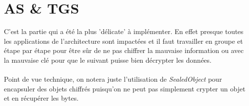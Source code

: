\documentclass[11pt,fleqn]{article}
\begin{document}
\section{AS \& TGS}
C'est la partie qui a été la plus 'délicate' à implémenter. En effet presque toutes les applications de l'architecture sont impactées et il faut travailler en groupe et étape par étape pour être sûr de ne pas chiffrer la mauvaise information ou avec la mauvaise clé pour que le suivant puisse bien décrypter les données.\\\\
Point de vue technique, on notera juste l'utilisation de \emph{SealedObject} pour encapsuler des objets chiffrés puisqu'on ne peut pas simplement crypter un objet et en récupérer les bytes.
\end{document}
